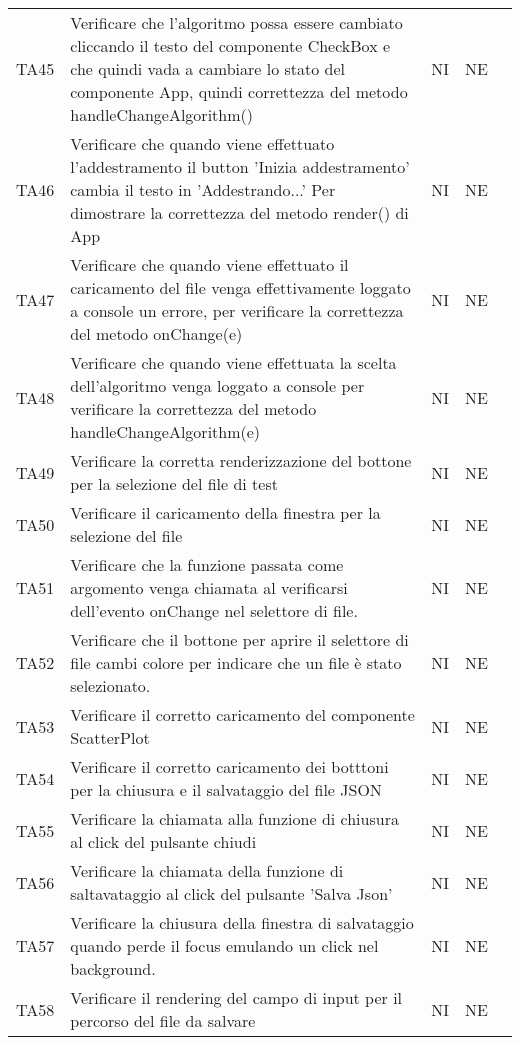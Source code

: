 \begin{longtable} {
		>{}p{15mm} 
		>{}p{79.5mm}
		>{}p{15mm} 
		>{}p{15mm}
		>{}p{0mm}}
	TA45	& Verificare che l'algoritmo possa essere cambiato cliccando il testo del componente CheckBox e che quindi vada a cambiare lo stato del componente App, quindi correttezza del metodo handleChangeAlgorithm() & NI & NE &\TBstrut \\ [2mm]
	TA46	& Verificare che quando viene effettuato l'addestramento il button 'Inizia addestramento' cambia il testo in 'Addestrando...' Per dimostrare la correttezza del metodo render() di App & NI & NE &\TBstrut \\ [2mm]
	TA47	& Verificare che quando viene effettuato il caricamento del file venga effettivamente loggato a console un errore, per verificare la correttezza del metodo onChange(e) & NI & NE &\TBstrut \\ [2mm]
	TA48	& Verificare che quando viene effettuata la scelta dell'algoritmo venga loggato a console per verificare la correttezza del metodo handleChangeAlgorithm(e) & NI & NE &\TBstrut \\ [2mm]
	TA49	& Verificare la corretta renderizzazione del bottone per la selezione del file di test & NI & NE &\TBstrut \\ [2mm]
	TA50	& Verificare il caricamento della finestra per la selezione del file & NI & NE &\TBstrut \\ [2mm]
	TA51	& Verificare che la funzione passata come argomento venga chiamata al verificarsi dell'evento onChange nel selettore di file. & NI & NE &\TBstrut \\ [2mm]
	TA52	& Verificare che il bottone per aprire il selettore di file cambi colore per indicare che un file è stato selezionato. & NI & NE &\TBstrut \\ [2mm]
	TA53	& Verificare il corretto caricamento del componente ScatterPlot & NI & NE &\TBstrut \\ [2mm]
	TA54	& Verificare il corretto caricamento dei botttoni per la chiusura e il salvataggio del file JSON & NI & NE &\TBstrut \\ [2mm]
	TA55	& Verificare la chiamata alla funzione di chiusura al click del pulsante chiudi & NI & NE &\TBstrut \\ [2mm]
	TA56	& Verificare la chiamata della funzione di saltavataggio al click del pulsante 'Salva Json' & NI & NE &\TBstrut \\ [2mm]
	TA57	& Verificare la chiusura della finestra di salvataggio quando perde il focus emulando un click nel background. & NI & NE &\TBstrut \\ [2mm]
	TA58	& Verificare il rendering del campo di input per il percorso del file da salvare & NI & NE &\TBstrut \\ [2mm]

\end{longtable}
